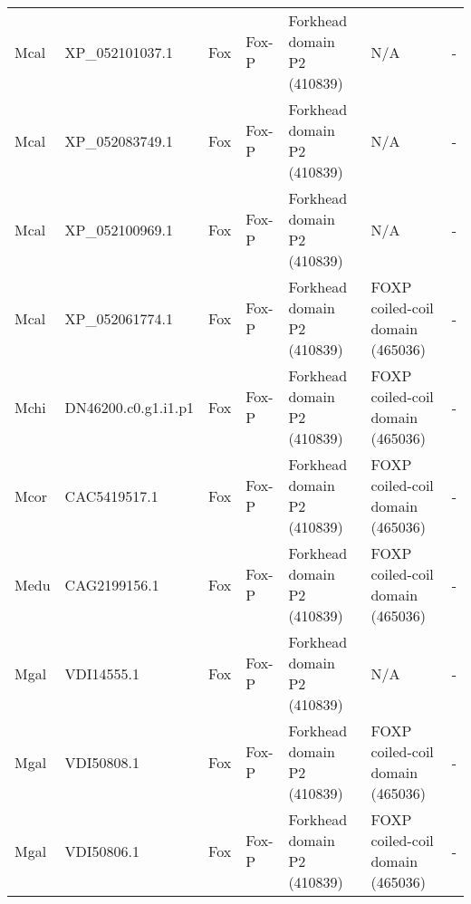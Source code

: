 \documentclass[../main.tex]{subfiles}
\begin{document}
\begin{landscape}
\begin{longtable}{lllllll}
		Mcal           & XP\_052101037.1       & Fox            & Fox-P               & Forkhead domain P2 (410839)                 & N/A                                                                    & -                    \\
		Mcal           & XP\_052083749.1       & Fox            & Fox-P               & Forkhead domain P2 (410839)                 & N/A                                                                    & -                    \\
		Mcal           & XP\_052100969.1       & Fox            & Fox-P               & Forkhead domain P2 (410839)                 & N/A                                                                    & -                    \\
		Mcal           & XP\_052061774.1       & Fox            & Fox-P               & Forkhead domain P2 (410839)                 & FOXP coiled-coil domain (465036)                                       & -                    \\
		Mchi           & DN46200.c0.g1.i1.p1   & Fox            & Fox-P               & Forkhead domain P2 (410839)                 & FOXP coiled-coil domain (465036)                                       & -                    \\
		Mcor           & CAC5419517.1          & Fox            & Fox-P               & Forkhead domain P2 (410839)                 & FOXP coiled-coil domain (465036)                                       & -                    \\
		Medu           & CAG2199156.1          & Fox            & Fox-P               & Forkhead domain P2 (410839)                 & FOXP coiled-coil domain (465036)                                       & -                    \\
		Mgal           & VDI14555.1            & Fox            & Fox-P               & Forkhead domain P2 (410839)                 & N/A                                                                    & -                    \\
		Mgal           & VDI50808.1            & Fox            & Fox-P               & Forkhead domain P2 (410839)                 & FOXP coiled-coil domain (465036)                                       & -                    \\
		Mgal           & VDI50806.1            & Fox            & Fox-P               & Forkhead domain P2 (410839)                 & FOXP coiled-coil domain (465036)                                       & -                    \\

\end{longtable}
\end{landscape}
\end{document}
